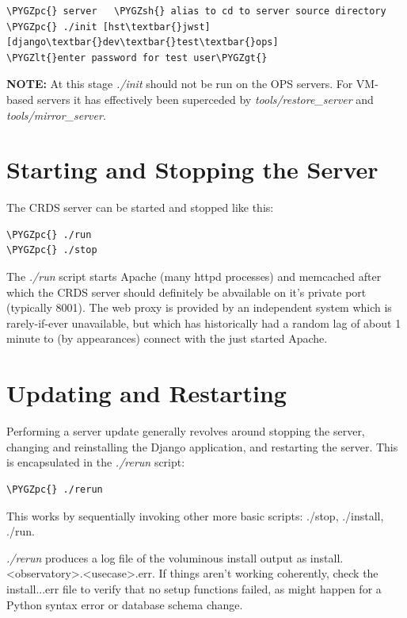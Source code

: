 \documentclass[letterpaper,10pt,english]{sphinxmanual}
\def\PYGZlt{\char`\<}
\def\PYGZgt{\char`\>}
\def\PYGZsh{\char`\#}
\def\PYGZpc{\char`\%}
\begin{document}
\begin{Verbatim}[commandchars=\\\{\}]
\PYGZpc{} server   \PYGZsh{} alias to cd to server source directory
\PYGZpc{} ./init [hst\textbar{}jwst] [django\textbar{}dev\textbar{}test\textbar{}ops]
\PYGZlt{}enter password for test user\PYGZgt{}
\end{Verbatim}

\textbf{NOTE:}  At this stage \emph{./init} should not be run on the OPS servers.   For VM-based servers it
has effectively been superceded by \emph{tools/restore\_server} and \emph{tools/mirror\_server}.


\section{Starting and Stopping the Server}
\label{server_guide:starting-and-stopping-the-server}
The CRDS server can be started and stopped like this:

\begin{Verbatim}[commandchars=\\\{\}]
\PYGZpc{} ./run
\PYGZpc{} ./stop
\end{Verbatim}

The \emph{./run} script starts Apache (many httpd processes) and memcached after which the CRDS server should definitely
be abvailable on it's private port (typically 8001).   The web proxy is provided by an independent system which
is rarely-if-ever unavailable,  but which has historically had a random lag of about 1 minute to (by appearances)
connect with the just started Apache.


\section{Updating and Restarting}
\label{server_guide:updating-and-restarting}
Performing a server update generally revolves around stopping the server,  changing and reinstalling the Django
application, and restarting the server.   This is encapsulated in the \emph{./rerun} script:

\begin{Verbatim}[commandchars=\\\{\}]
\PYGZpc{} ./rerun
\end{Verbatim}

This works by sequentially invoking other more basic scripts: ./stop, ./install, ./run.

\emph{./rerun} produces a log file of the voluminous install output as install.\textless{}observatory\textgreater{}.\textless{}usecase\textgreater{}.err.  If things
aren't working coherently,  check the install...err file to verify that no setup functions failed,  as might
happen for a Python syntax error or database schema change.
\end{document}
